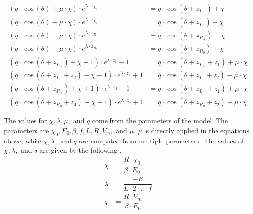\begin{subequations}
	\begin{align}
		(q \cdot \cos(\theta) + \mu \cdot \chi) \cdot e^{\lambda \cdot z_{L_+}}
		 & = q \cdot \cos(\theta + z_{L_+}) + \chi \label{equ:setup.og.def.impl.1.A}                  \\
		(q \cdot \cos(\theta) + \mu \cdot \chi) \cdot e^{\lambda \cdot z_{L_0}}
		 & = q \cdot \cos(\theta + z_{L_0}) - \chi                                                    \\
		(q \cdot \cos(\theta) - \mu \cdot \chi) \cdot e^{\lambda \cdot z_{R_+}}
		 & = q \cdot \cos(\theta + z_{R_+}) - \chi                                                    \\
		(q \cdot \cos(\theta) - \mu \cdot \chi) \cdot e^{\lambda \cdot z_{R_0}}
		 & = q \cdot \cos(\theta + z_{R_0}) + \chi \label{equ:setup.og.def.impl.1.D}
		\\
		(q \cdot \cos(\theta + z_{L_+}) + \chi + 1) \cdot e^{\lambda \cdot z_1} - 1
		 & = q \cdot  \cos(\theta + z_{L_+} + z_1) + \mu \cdot \chi \label{equ:setup.og.def.impl.2.A} \\
		(q \cdot \cos(\theta + z_{L_0} + z_2) - \chi - 1) \cdot e^{\lambda \cdot z_2} + 1
		 & = q \cdot  \cos(\theta + z_{L_0} + z_2) - \mu \cdot \chi                                   \\
		(q \cdot \cos(\theta + z_{R_+}) + \chi + 1) \cdot e^{\lambda \cdot z_3} - 1
		 & = q \cdot  \cos(\theta + z_{L_+} + z_1) + \mu \cdot \chi                                   \\
		(q \cdot \cos(\theta + z_{R_0} + z_4) - \chi - 1) \cdot e^{\lambda \cdot z_4} + 1
		 & = q \cdot  \cos(\theta + z_{R_0} + z_2) - \mu \cdot \chi \label{equ:setup.og.def.impl.2.D}
	\end{align}
\end{subequations}

The values for $\chi, \lambda, \mu,$ and $q$ come from the parameters of the model.
The parameters are $\chi_0, E_0, \beta, f, L, R, V_m,$ and $\mu$.
$\mu$ is directly applied in the equations above, while $\chi, \lambda,$ and $q$ are computed from multiple parameters.
The values of $\chi, \lambda,$ and $q$ are given by the following .
\begin{subequations}
	\begin{align}
		\chi    & = \dfrac{R \cdot \chi_0}{\beta \cdot E_0} \label{equ:setup.og.def.param.chi} \\
		\lambda & = \dfrac{-R}{L \cdot 2 \cdot \pi \cdot f}                                    \\
		q       & = \dfrac{R \cdot V_m}{\beta \cdot E_0} \label{equ:setup.og.def.param.q}
	\end{align}
\end{subequations}

